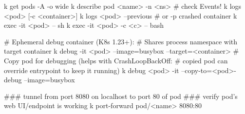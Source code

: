 \begin{tcbitemize}[
  raster columns=3, raster equal height=rows,
  blanker, cheat subtitle
]
  \tcbitem
    \begin{tcbitemize}[
      raster columns=1, raster equal height=rows,
      blanker, cheat subtitle
    ]

      \tcbitem
        \begin{cheatcodebash}
        k get pods -A -o wide
        k describe pod <name> -n <ns>   # check Events!
        k logs <pod> [-c <container>]
        k logs <pod> --previous         # or -p crashed container
        k exec -it <pod> -- sh
        k exec -it <pod> -c <c> -- bash
        \end{cheatcodebash}
        \begin{cheatcodebash}
        # Ephemeral debug container (K8s 1.23+):
        # Shares process namespace with target container
        k debug -it <pod> --image=busybox --target=<container>
        # Copy pod for debugging (helps with CrashLoopBackOff:
        # copied pod can override entrypoint to keep it running)
        k debug <pod> -it --copy-to=<pod>-debug --image=busybox
        \end{cheatcodebash}
        \begin{cheatcodebashbold}
        ### tunnel from port 8080 on localhost to port 80 of pod
        ### verify pod's web UI/endpoint is working
        k port-forward pod/<name> 8080:80
        \end{cheatcodebashbold}


\end{tcbitemize}
\end{tcbitemize}

